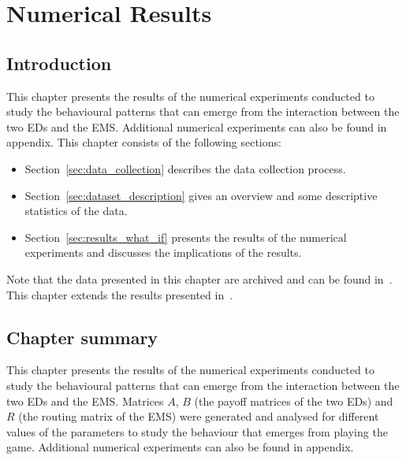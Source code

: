 \chapter{Numerical Results}\label{sec:numerical_results}

\section{Introduction}

This chapter presents the results of the numerical experiments conducted to
study the behavioural patterns that can emerge from the interaction between the
two EDs and the EMS.
Additional numerical experiments can also be found in appendix.
This chapter consists of the following sections:
\begin{itemize}
    \item Section~\ref{sec:data_collection} describes the data collection
    process.
    \item Section~\ref{sec:dataset_description} gives an overview and some
    descriptive statistics of the data.
    \item Section~\ref{sec:results_what_if} presents the results of the
    numerical experiments and discusses the implications of the results.
\end{itemize}

Note that the data presented in this chapter are archived and can be found
in~\cite{michalis_panayides_2023_7555285}.
This chapter extends the results presented in~\cite{panayides2023game}.









\section{Chapter summary}

This chapter presents the results of the numerical experiments conducted to
study the behavioural patterns that can emerge from the interaction between the
two EDs and the EMS.
Matrices \(A\), \(B\) (the payoff matrices of the two EDs) and \(R\) (the
routing matrix of the EMS) were generated and analysed for different values of
the parameters to study the behaviour that emerges from playing the game.
Additional numerical experiments can also be found in appendix.

